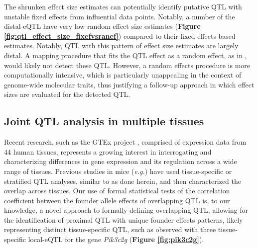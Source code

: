 \documentclass[9pt,twocolumn,twoside]{gsajnl}
\newcommand{\eg}{\emph{e.g.}}
\begin{document}
The shrunken effect size estimates can potentially identify putative QTL with unstable fixed effects from influential data points. Notably, a number of the distal-eQTL have very low random effect size estimates (\textbf{Figure \ref{fig:qtl_effect_size_fixefvsranef}}) compared to their fixed effects-based estimates. Notably, QTL with this pattern of effect size estimates are largely distal. A mapping procedure that fits the QTL effect as a random effect, as in \cite{Wei2016}, would likely not detect these QTL. However, a random effects procedure is more computationally intensive, which is particularly unappealing in the context of genome-wide molecular traits, thus justifying a follow-up approach in which effect sizes are evaluated for the detected QTL.

\subsection{Joint QTL analysis in multiple tissues}

Recent research, such as the GTEx project \citep{GTEX2017}, comprised of expression data from 44 human tissues, represents a growing interest in interrogating and characterizing differences in gene expression and its regulation across a wide range of tissues. Previous studies in mice (\eg \citealt{Huang2009}) have used tissue-specific or stratified QTL analyses, similar to as done herein, and then characterized the overlap across tissues. Our use of formal statistical tests of the correlation coefficient between the founder allele effects of overlapping QTL is, to our knowledge, a novel approach to formally defining overlapping QTL, allowing for the identification of proximal QTL with unique founder effects patterns, likely representing distinct tissue-specific QTL, such as observed with three tissue-specific local-eQTL for the gene \textit{Pik3c2g} (\textbf{Figure \ref{fig:pik3c2g}}). 
\end{document}
